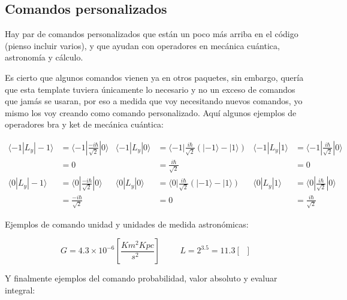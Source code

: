 \documentclass[11pt,letterpaper]{article}
\DeclareMathOperator{\lsol}{L_\odot}               %
\DeclareMathOperator{\msol}{M_\odot}               %
\newcommand{\units}[1]{\left[ #1 \right]}          %
\newcommand{\bra}[1]{\langle #1 |}                 %
\newcommand{\ket}[1]{| #1 \rangle}                 %
\begin{document}
\subsection*{Comandos personalizados}
Hay par de comandos personalizados que están un poco más arriba en el código (pienso incluir varios), y que ayudan con operadores en mecánica cuántica, astronomía y cálculo.\par

Es cierto que algunos comandos vienen ya en otros paquetes, sin embargo, quería que esta template tuviera únicamente lo necesario y no un exceso de comandos que jamás se usaran, por eso a medida que voy necesitando nuevos comandos, yo mismo los voy creando como comando personalizado. Aquí algunos ejemplos de operadores bra y ket de mecánica cuántica:

\begin{align*}
    \bra{-1}L_y\ket{-1} &= \bra{-1}\frac{-i\hbar}{\sqrt{2}}\ket{0} & \bra{-1}L_y\ket{0} &= \bra{-1}\frac{i\hbar}{\sqrt{2}}(\ket{-1} - \ket{1}) & \bra{-1}L_y\ket{1} &= \bra{-1}\frac{i\hbar}{\sqrt{2}}\ket{0}\\
     &= 0 & &= \frac{i\hbar}{\sqrt{2}} & &= 0\\
    \bra{0}L_y\ket{-1} &= \bra{0}\frac{-i\hbar}{\sqrt{2}}\ket{0} & \bra{0}L_y\ket{0} &= \bra{0}\frac{i\hbar}{\sqrt{2}}(\ket{-1} - \ket{1}) & \bra{0}L_y\ket{1} &= \bra{0}\frac{i\hbar}{\sqrt{2}}\ket{0}\\
     &= \frac{-i\hbar}{\sqrt{2}} & &= 0 & &= \frac{i\hbar}{\sqrt{2}}
\end{align*}

Ejemplos de comando unidad y unidades de medida astronómicas:

\begin{equation*}
    G = 4.3\times10^{-6}\units{\frac{Km^2Kpc}{s^2\msol}} \hspace{1cm} L = 2^{3.5} = 11.3 \units{\lsol}
\end{equation*}

Y finalmente ejemplos del comando probabilidad, valor absoluto y evaluar integral:
\end{document}

